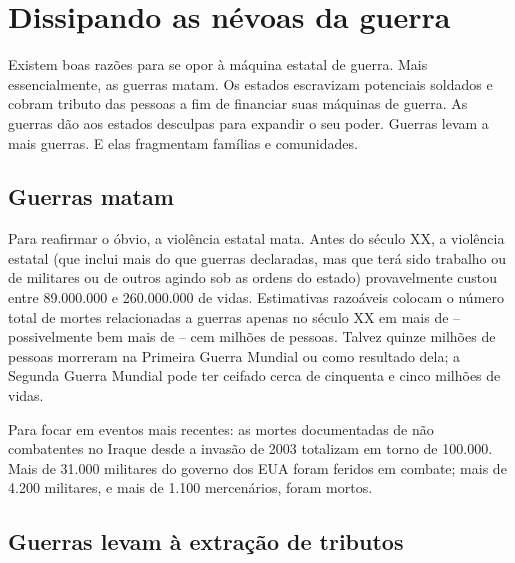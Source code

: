 \section{Dissipando as névoas da guerra}

Existem boas razões para se opor à máquina estatal de guerra. Mais essencialmente, as guerras matam. Os estados escravizam potenciais soldados e cobram tributo das pessoas a fim de financiar suas máquinas de guerra. As guerras dão aos estados desculpas para expandir o seu poder. Guerras levam a mais guerras. E elas fragmentam famílias e comunidades.

\subsection*{Guerras matam}

Para reafirmar o óbvio, a violência estatal mata. Antes do século XX, a violência estatal (que inclui mais do que guerras declaradas, mas que terá sido trabalho ou de militares ou de outros agindo sob as ordens do estado) provavelmente custou entre 89.000.000 e 260.000.000 de vidas. Estimativas razoáveis colocam o número total de mortes relacionadas a guerras apenas no século XX em mais de -- possivelmente bem mais de -- cem milhões de pessoas. Talvez quinze milhões de pessoas morreram na Primeira Guerra Mundial ou como resultado dela; a Segunda Guerra Mundial pode ter ceifado cerca de cinquenta e cinco milhões de vidas.

Para focar em eventos mais recentes: as mortes documentadas de não combatentes no Iraque desde a invasão de 2003 totalizam em torno de 100.000. Mais de 31.000 militares do governo dos EUA foram feridos em combate; mais de 4.200 militares, e mais de 1.100 mercenários, foram mortos.

\subsection*{Guerras levam à extração de tributos}


